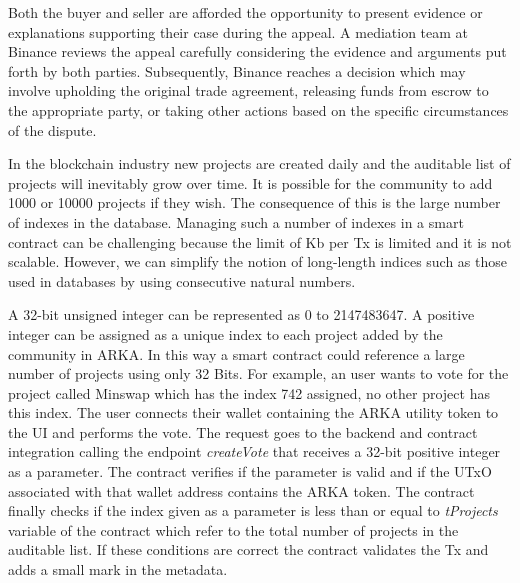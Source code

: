 \documentclass[12pt]{article}
\begin{document}
Both the buyer and seller are afforded the opportunity to present evidence or explanations supporting their case during the appeal. A mediation team at Binance reviews the appeal carefully considering the evidence and arguments put forth by both parties. Subsequently, Binance reaches a decision which may involve upholding the original trade agreement, releasing funds from escrow to the appropriate party, or taking other actions based on the specific circumstances of the dispute.






















In the blockchain industry new projects are created daily and the auditable list of projects will inevitably grow over time. It is possible for the community to add 1000 or 10000 projects if they wish. The consequence of this is the large number of indexes in the database. Managing such a number of indexes in a smart contract can be challenging because the limit of Kb per Tx is limited and it is not scalable. However, we can simplify the notion of long-length indices such as those used in databases by using consecutive natural numbers.

A 32-bit unsigned integer can be represented as 0 to 2147483647. A positive integer can be assigned as a unique index to each project added by the community in ARKA. In this way a smart contract could reference a large number of projects using only 32 Bits. For example, an user wants to vote for the project called Minswap which has the index 742 assigned, no other project has this index. The user connects their wallet containing the ARKA utility token to the UI and performs the vote. The request goes to the backend and contract integration calling the endpoint \emph{createVote} that receives a 32-bit positive integer as a parameter. The contract verifies if the parameter is valid and if the UTxO associated with that wallet address contains the ARKA token. The contract finally checks if the index given as a parameter is less than or equal to \emph{tProjects} variable of the contract which refer to the total number of projects in the auditable list. If these conditions are correct the contract validates the Tx and adds a small mark in the metadata.
\end{document}
